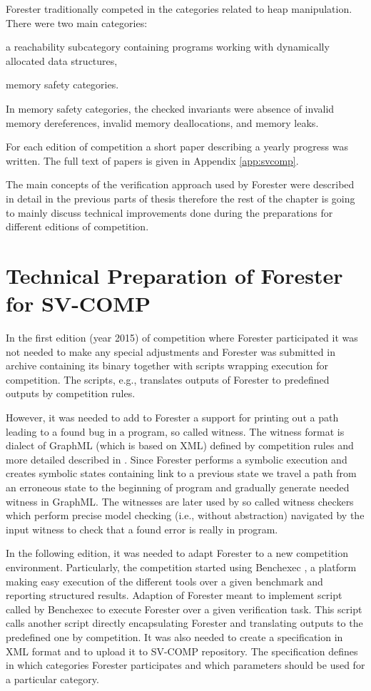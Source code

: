 {Forester traditionally competed in the categories related to heap manipulation.
There were two main categories:
\begin{enumerate*}
  \item a reachability subcategory containing programs working with dynamically allocated data structures,
  \item memory safety categories.
\end{enumerate*}
In memory safety categories, the checked invariants were absence of invalid memory dereferences,
invalid memory deallocations, and memory leaks.

For each edition of competition a short paper describing a yearly progress was written.
The full text of papers is given in Appendix \ref{app:svcomp}.

The main concepts of the verification approach used by Forester were described in detail in the previous parts of thesis
therefore the rest of the chapter is going to mainly discuss technical improvements done during the preparations for different editions of competition.

\section{Technical Preparation of Forester for SV-COMP}
In the first edition (year 2015) \cite{svcomp15-forester} of competition where Forester participated it was not
needed to make any special adjustments and Forester was submitted in archive containing its binary together
with scripts wrapping execution for competition.
The scripts, e.g., translates outputs of Forester to predefined outputs by competition rules.

However, it was needed to add to Forester a support for printing out a path leading to a found bug in a program,
so called witness.
The witness format is dialect of GraphML (which is based on XML) defined by competition rules and more detailed described in \cite{fse15-witness}.
Since Forester performs a symbolic execution and creates symbolic states containing link to a previous state
we travel a path from an erroneous state to the beginning of program and gradually generate needed witness in GraphML.
The witnesses are later used by so called witness checkers which perform precise model checking (i.e., without abstraction)
navigated by the input witness to check that a found error is really in program.

In the following edition, it was needed to adapt Forester to a new competition environment.
Particularly, the competition started using Benchexec \cite{sttt-benchexec}, a platform
making easy execution of the different tools over a given benchmark and reporting structured results.
Adaption of Forester meant to implement script called by Benchexec to execute Forester over a given 
verification task.
This script calls another script directly encapsulating Forester and translating outputs to the predefined
one by competition.
It was also needed to create a specification in XML format and to upload it to SV-COMP repository.
The specification defines in which categories Forester participates and which parameters should be used
for a particular category.

}
